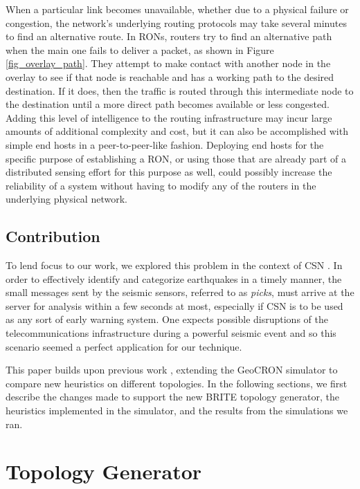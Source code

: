 \documentclass[conference]{IEEEtran}
\begin{document}
When a particular link becomes unavailable, whether due to a physical failure or congestion, the network's underlying routing protocols may take several minutes to find an alternative route.
In RONs, routers try to find an alternative path when the main one fails to deliver a packet, as shown in Figure \ref{fig_overlay_path}.
They attempt to make contact with another node in the overlay to see if that node is reachable and has a working path to the desired destination.
If it does, then the traffic is routed through this intermediate node to the destination until a more direct path becomes available or less congested.
Adding this level of intelligence to the routing infrastructure may incur large amounts of additional complexity and cost, but it can also be accomplished with simple end hosts in a peer-to-peer-like fashion.
Deploying end hosts for the specific purpose of establishing a RON, or using those that are already part of a distributed sensing effort for this purpose as well, could possibly increase the reliability of a system without having to modify any of the routers in the underlying physical network.

\subsection{Contribution}
To lend focus to our work, we explored this problem in the context of CSN \cite{csn_site}.
In order to effectively identify and categorize earthquakes in a timely manner, the small messages sent by the seismic sensors, referred to as \emph{picks}, must arrive at the server for analysis within a few seconds at most, especially if CSN is to be used as any sort of early warning system.
One expects possible disruptions of the telecommunications infrastructure during a powerful seismic event and so this scenario seemed a perfect application for our technique.

This paper builds upon previous work \cite{Benson2013}, extending the GeoCRON simulator to compare new heuristics on different topologies.
In the following sections, we first describe the changes made to support the new BRITE topology generator, the heuristics implemented in the simulator, and the results from the simulations we ran.


\section{Topology Generator}
\end{document}
